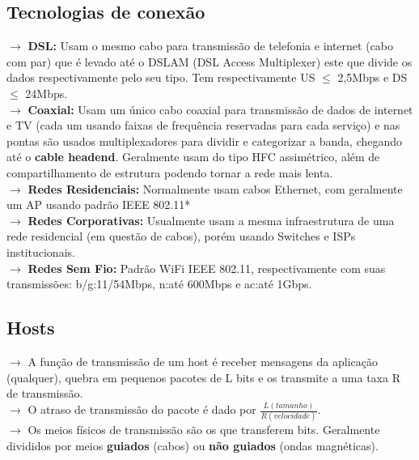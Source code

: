 \documentclass[12pt]{article}
\begin{document}
    \subsection{Tecnologias de conexão}
    $\rightarrow$ \textbf{DSL:} Usam o mesmo cabo para transmissão de telefonia e internet (cabo com par) que é levado até o DSLAM (DSL Access Multiplexer) este que divide os dados respectivamente pelo seu tipo. Tem respectivamente US $\leq$ 2,5Mbps e DS $\leq$ 24Mbps.
    \\$\rightarrow$ \textbf{Coaxial:} Usam um único cabo coaxial para transmissão de dados de internet e TV (cada um usando faixas de frequência reservadas para cada serviço) e nas pontas são usados multiplexadores para dividir e categorizar a banda, chegando até o \textbf{cable headend}. Geralmente usam do tipo HFC assimétrico, além de compartilhamento de estrutura podendo tornar a rede mais lenta.
    \\$\rightarrow$ \textbf{Redes Residenciais:} Normalmente usam cabos Ethernet, com geralmente um AP usando padrão IEEE 802.11*
    \\$\rightarrow$ \textbf{Redes Corporativas:} Usualmente usam a mesma infraestrutura de uma rede residencial (em questão de cabos), porém usando Switches e ISPs institucionais.
    \\$\rightarrow$ \textbf{Redes Sem Fio:} Padrão WiFi IEEE 802.11, respectivamente com suas transmissões: b/g:11/54Mbps, n:até 600Mbps e ac:até 1Gbps.

    \subsection{Hosts}
    $\rightarrow$ A função de transmissão de um host é receber mensagens da aplicação (qualquer), quebra em pequenos pacotes de L bits e os transmite a uma taxa R de transmissão.
    \\$\rightarrow$ O atraso de transmissão do pacote é dado por $\frac{L (tamanho)}{R (velocidade)}$.
    \\$\rightarrow$ Os meios físicos de transmissão são os que transferem bits. Geralmente divididos por meios \textbf{guiados} (cabos) ou \textbf{não guiados} (ondas magnéticas).
    


\end{document}
